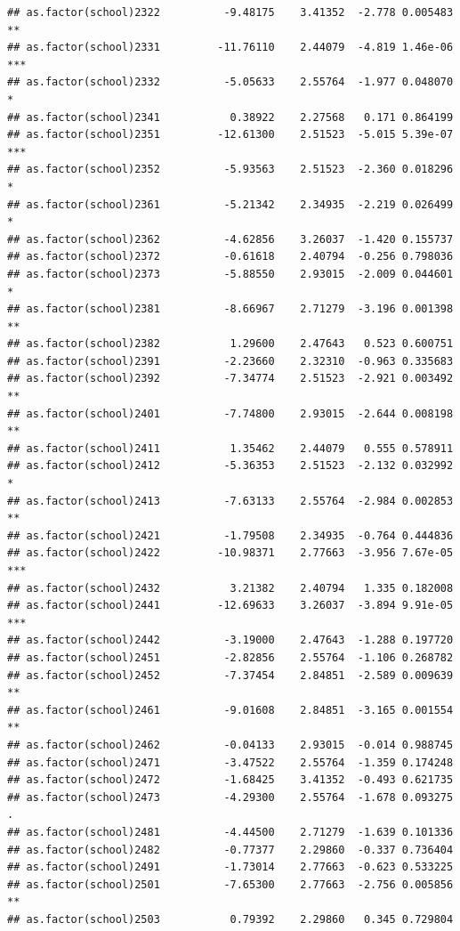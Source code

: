 \documentclass[ignorenonframetext,]{beamer}
\begin{document}
\begin{frame}[fragile]{}
\begin{verbatim}
## as.factor(school)2322          -9.48175    3.41352  -2.778 0.005483 ** 
## as.factor(school)2331         -11.76110    2.44079  -4.819 1.46e-06 ***
## as.factor(school)2332          -5.05633    2.55764  -1.977 0.048070 *  
## as.factor(school)2341           0.38922    2.27568   0.171 0.864199    
## as.factor(school)2351         -12.61300    2.51523  -5.015 5.39e-07 ***
## as.factor(school)2352          -5.93563    2.51523  -2.360 0.018296 *  
## as.factor(school)2361          -5.21342    2.34935  -2.219 0.026499 *  
## as.factor(school)2362          -4.62856    3.26037  -1.420 0.155737    
## as.factor(school)2372          -0.61618    2.40794  -0.256 0.798036    
## as.factor(school)2373          -5.88550    2.93015  -2.009 0.044601 *  
## as.factor(school)2381          -8.66967    2.71279  -3.196 0.001398 ** 
## as.factor(school)2382           1.29600    2.47643   0.523 0.600751    
## as.factor(school)2391          -2.23660    2.32310  -0.963 0.335683    
## as.factor(school)2392          -7.34774    2.51523  -2.921 0.003492 ** 
## as.factor(school)2401          -7.74800    2.93015  -2.644 0.008198 ** 
## as.factor(school)2411           1.35462    2.44079   0.555 0.578911    
## as.factor(school)2412          -5.36353    2.51523  -2.132 0.032992 *  
## as.factor(school)2413          -7.63133    2.55764  -2.984 0.002853 ** 
## as.factor(school)2421          -1.79508    2.34935  -0.764 0.444836    
## as.factor(school)2422         -10.98371    2.77663  -3.956 7.67e-05 ***
## as.factor(school)2432           3.21382    2.40794   1.335 0.182008    
## as.factor(school)2441         -12.69633    3.26037  -3.894 9.91e-05 ***
## as.factor(school)2442          -3.19000    2.47643  -1.288 0.197720    
## as.factor(school)2451          -2.82856    2.55764  -1.106 0.268782    
## as.factor(school)2452          -7.37454    2.84851  -2.589 0.009639 ** 
## as.factor(school)2461          -9.01608    2.84851  -3.165 0.001554 ** 
## as.factor(school)2462          -0.04133    2.93015  -0.014 0.988745    
## as.factor(school)2471          -3.47522    2.55764  -1.359 0.174248    
## as.factor(school)2472          -1.68425    3.41352  -0.493 0.621735    
## as.factor(school)2473          -4.29300    2.55764  -1.678 0.093275 .  
## as.factor(school)2481          -4.44500    2.71279  -1.639 0.101336    
## as.factor(school)2482          -0.77377    2.29860  -0.337 0.736404    
## as.factor(school)2491          -1.73014    2.77663  -0.623 0.533225    
## as.factor(school)2501          -7.65300    2.77663  -2.756 0.005856 ** 
## as.factor(school)2503           0.79392    2.29860   0.345 0.729804    

\end{verbatim}
\end{frame}
\end{document}
